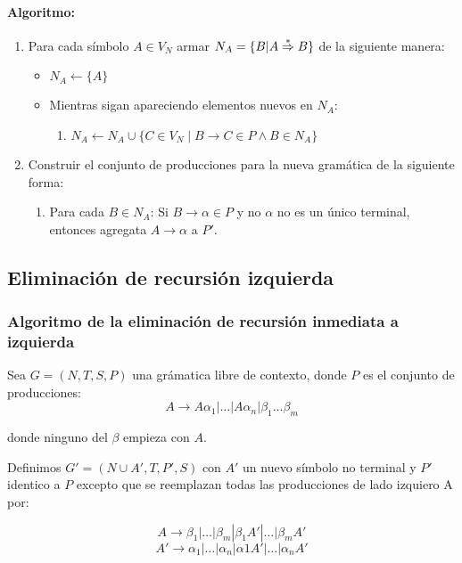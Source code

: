 \paragraph{Algoritmo:}
\begin{enumerate}
  \item Para cada símbolo \(A\in V_N\) armar \(N_A = \{ B | A \overset{*}{\Rightarrow} B\}\) de la siguiente manera:
        \begin{itemize}
          \item[]  \(N_A \leftarrow \{A\}\)
          \item[] Mientras sigan apareciendo elementos nuevos en \(N_A\):
            \begin{enumerate}
              \item[] \(N_A\leftarrow N_A\cup\{C\in V_N\mid B\to C \in P \land B\in N_A\}\)
            \end{enumerate}
        \end{itemize}
  \item Construir el conjunto de producciones para la nueva gramática de la siguiente forma:
        \begin{enumerate}
          \item Para cada \(B \in N_A\): Si \(B\to\alpha\in P\) y no \(\alpha\) no es un único terminal, entonces agregata \(A\to\alpha\) a \(P'\).
        \end{enumerate}
\end{enumerate}

\subsection{Eliminación de recursión izquierda}
\subsubsection{Algoritmo de la eliminación de recursión inmediata a izquierda}
Sea \(G = (N, T, S, P)\) una grámatica libre de contexto, donde \(P\) es el conjunto de producciones: \[A\to A\alpha_1|\dots|A\alpha_n|\beta_1\dots \beta_m\]

donde ninguno del \(\beta\) empieza con \(A\).

Definimos \(G' = (N\cup{A'}, T, P', S)\) con \(A'\) un nuevo símbolo no terminal y \(P'\) identico a \(P\) excepto que se reemplazan todas las producciones de lado izquiero A por:

\[A\to\beta_1|\dots|\beta_m|\beta_1A'|\dots|\beta_mA'\]
\[A'\to\alpha_1|\dots|\alpha_n|\alpha1A'|\dots|\alpha_nA'\]

